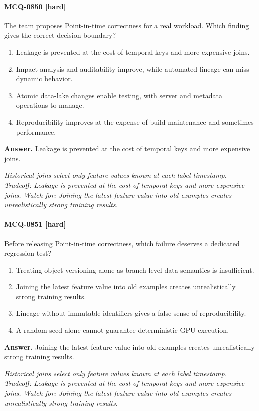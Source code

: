 \paragraph{MCQ-0850 [hard]} The team proposes Point-in-time correctness for a real workload. Which finding gives the correct decision boundary?
\begin{enumerate}[label=\Alph*.]
\item Leakage is prevented at the cost of temporal keys and more expensive joins.
\item Impact analysis and auditability improve, while automated lineage can miss dynamic behavior.
\item Atomic data-lake changes enable testing, with server and metadata operations to manage.
\item Reproducibility improves at the expense of build maintenance and sometimes performance.
\end{enumerate}
\noindent\textbf{Answer.} Leakage is prevented at the cost of temporal keys and more expensive joins.
\par\textit{Historical joins select only feature values known at each label timestamp. Tradeoff: Leakage is prevented at the cost of temporal keys and more expensive joins. Watch for: Joining the latest feature value into old examples creates unrealistically strong training results.}
\paragraph{MCQ-0851 [hard]} Before releasing Point-in-time correctness, which failure deserves a dedicated regression test?
\begin{enumerate}[label=\Alph*.]
\item Treating object versioning alone as branch-level data semantics is insufficient.
\item Joining the latest feature value into old examples creates unrealistically strong training results.
\item Lineage without immutable identifiers gives a false sense of reproducibility.
\item A random seed alone cannot guarantee deterministic GPU execution.
\end{enumerate}
\noindent\textbf{Answer.} Joining the latest feature value into old examples creates unrealistically strong training results.
\par\textit{Historical joins select only feature values known at each label timestamp. Tradeoff: Leakage is prevented at the cost of temporal keys and more expensive joins. Watch for: Joining the latest feature value into old examples creates unrealistically strong training results.}
